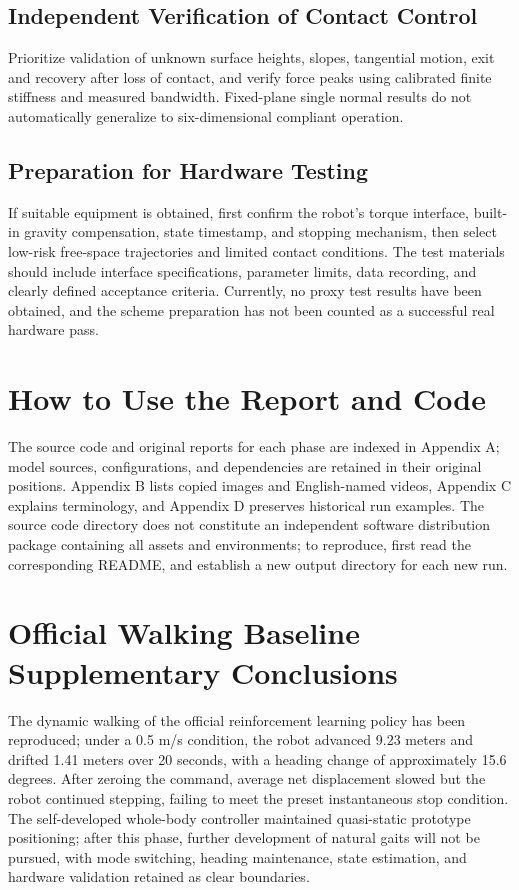 \subsection{Independent Verification of Contact Control}
Prioritize validation of unknown surface heights, slopes, tangential motion, exit and recovery after loss of contact, and verify force peaks using calibrated finite stiffness and measured bandwidth. Fixed-plane single normal results do not automatically generalize to six-dimensional compliant operation.
\subsection{Preparation for Hardware Testing}
If suitable equipment is obtained, first confirm the robot's torque interface, built-in gravity compensation, state timestamp, and stopping mechanism, then select low-risk free-space trajectories and limited contact conditions. The test materials should include interface specifications, parameter limits, data recording, and clearly defined acceptance criteria. Currently, no proxy test results have been obtained, and the scheme preparation has not been counted as a successful real hardware pass.
\section{How to Use the Report and Code}
The source code and original reports for each phase are indexed in Appendix A; model sources, configurations, and dependencies are retained in their original positions. Appendix B lists copied images and English-named videos, Appendix C explains terminology, and Appendix D preserves historical run examples. The source code directory does not constitute an independent software distribution package containing all assets and environments; to reproduce, first read the corresponding README, and establish a new output directory for each new run.

\section{Official Walking Baseline Supplementary Conclusions}
The dynamic walking of the official reinforcement learning policy has been reproduced; under a 0.5 m/s condition, the robot advanced 9.23 meters and drifted 1.41 meters over 20 seconds, with a heading change of approximately 15.6 degrees. After zeroing the command, average net displacement slowed but the robot continued stepping, failing to meet the preset instantaneous stop condition. The self-developed whole-body controller maintained quasi-static prototype positioning; after this phase, further development of natural gaits will not be pursued, with mode switching, heading maintenance, state estimation, and hardware validation retained as clear boundaries.
